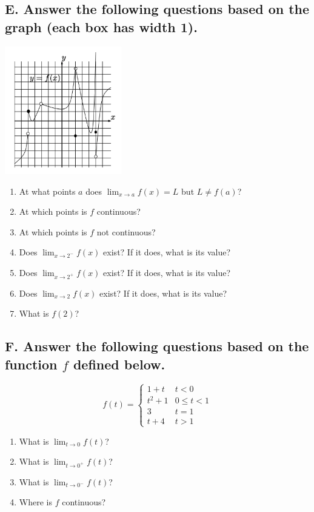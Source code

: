 \documentclass{article}
\begin{document}
\subsection*{E. Answer the following questions based on the graph (each box has width 1).}
\begin{paracol}{2}
\includegraphics[width=2in]{img/piecewise.png}
\switchcolumn
\vspace{2em}

\begin{enumerate}
\item At what points $a$ does $\displaystyle \lim_{x\to a} f(x)=L$ but $L\neq f(a)$?
\item At which points is $f$ continuous?
\item At which points is $f$ not continuous?
\item Does $\displaystyle\lim _{x \to 2^{-}} f(x)$ exist? If it does, what is its value?
\item Does $\displaystyle\lim _{x \to 2^{+}} f(x)$ exist? If it does, what is its value?
\item Does $\displaystyle\lim _{x \to 2} f(x)$ exist? If it does, what is its value?
\item What is $f(2)$?
\end{enumerate}
\end{paracol}


\newpage
\subsection*{F. Answer the following questions based on the function $f$ defined below.}
\begin{multicols}{2}
$$f(t)=\begin{cases}
1+t & t<0 \\
t^2+1 & 0 \leq t<1 \\ 
3 & t=1 \\
t+4 & t>1
\end{cases}$$
\columnbreak
\begin{enumerate}
\item What is $\displaystyle\lim_{t\to 0}f(t)$?
\item What is $\displaystyle\lim_{t\to 0^+}f(t)$?
\item What is $\displaystyle\lim_{t\to 0^-}f(t)$?
\item Where is $f$ continuous?
\end{enumerate}
\end{multicols}
\end{document}
